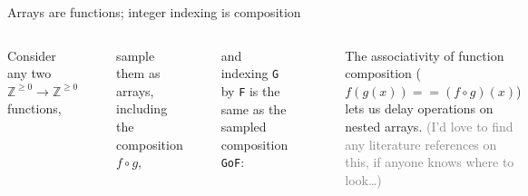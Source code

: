\documentclass[aspectratio=169]{beamer}
\begin{document}
\begin{frame}[fragile]{Arrays are functions; integer indexing is composition}
\vspace{0.35 cm}
\begin{columns}
\small
Consider any two $\mathbb{Z}^{\ge 0} \to \mathbb{Z}^{\ge 0}$ functions,

\scriptsize
\vspace{-0.05 cm}
\begin{verbatim}
def f(x):
    return x**2 - 5*x + 10
def g(y):
    return max(0, 2*y - 10) + 3
\end{verbatim}

\small
\vspace{-0.05 cm}
sample them as arrays, including the composition $f \circ g$,

\scriptsize
\vspace{-0.05 cm}
\begin{verbatim}
F   = numpy.array([f(i) for i in range(10)])     # F is f at 10 elements
G   = numpy.array([g(i) for i in range(100)])    # G is g at 100 elements (to cover max(F))
GoF = numpy.array([g(f(i)) for i in range(10)])  # GoF is g∘f at 10 elements
\end{verbatim}

\small
\vspace{-0.05 cm}
and indexing \texttt{G} by \texttt{F} is the same as the sampled composition \texttt{GoF}:

\scriptsize
\vspace{-0.05 cm}
\begin{verbatim}
print("G\u2218F =", G[F])   # integer indexing
print("g\u2218f =", GoF)    # array of the composed functions
\end{verbatim}

\vspace{-0.6 cm}
\begin{verbatim}
G∘F = [13  5  3  3  5 13 25 41 61 85]
g∘f = [13  5  3  3  5 13 25 41 61 85]
\end{verbatim}

\small
\vspace{-0.05 cm}
The associativity of function composition ($f(g(x)) == (f \circ g)(x)$) lets us delay operations on nested arrays. \textcolor{gray}{(I'd love to find any literature references on this, if anyone knows where to look\ldots)}
\end{columns}
\end{frame}
\end{document}
